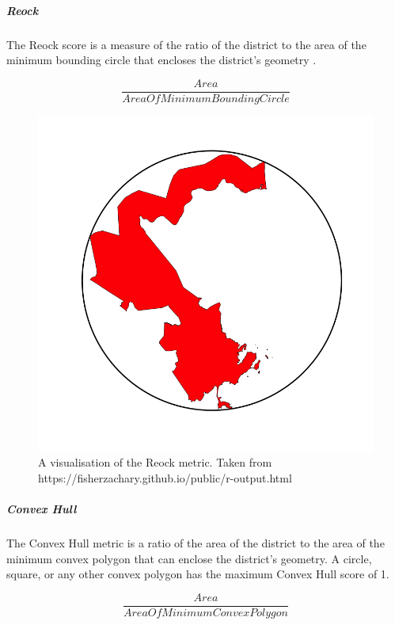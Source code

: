 \documentclass[]{article}
\let\oldsubparagraph\subparagraph
\renewcommand{\subparagraph}[1]{\oldsubparagraph{#1}\mbox{}}
\begin{document}
\hypertarget{reock}{%
\subparagraph{Reock}\label{reock}}

The Reock score is a measure of the ratio of the district to the area of
the minimum bounding circle that encloses the district's geometry
\citep{reock1961}.

\[\frac{Area}{AreaOfMinimumBoundingCircle}\]

\begin{figure}
\centering
\includegraphics{img/reock.png}
\caption{A visualisation of the Reock metric. Taken from
https://fisherzachary.github.io/public/r-output.html}
\end{figure}

\hypertarget{convex-hull}{%
\subparagraph{Convex Hull}\label{convex-hull}}

The Convex Hull metric is a ratio of the area of the district to the
area of the minimum convex polygon that can enclose the district's
geometry. A circle, square, or any other convex polygon has the maximum
Convex Hull score of 1.

\[\frac{Area}{AreaOfMinimumConvexPolygon}\]
\end{document}
